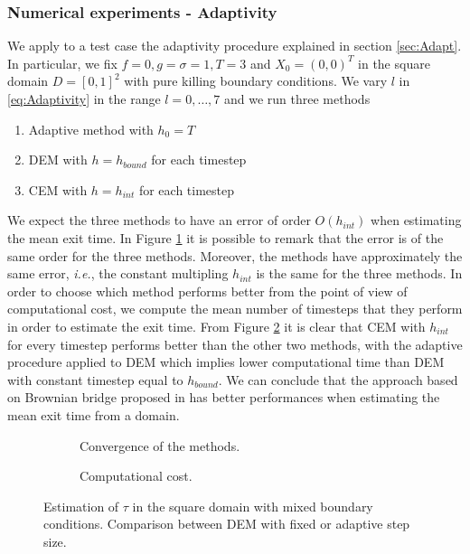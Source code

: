 \subsubsection{Numerical experiments - Adaptivity}
We apply to a test case the adaptivity procedure explained in section \ref{sec:Adapt}. In particular, we fix $f = 0, g = \sigma = 1, T = 3$ and $X_0 = (0,0)^T$ in the square domain $D = \left[0,1\right]^2$ with pure killing boundary conditions. We vary $l$ in \eqref{eq:Adaptivity} in the range $l = 0, \dots, 7$ and we run three methods
\begin{enumerate}
	\item Adaptive method with $h_0 = T$
	\item DEM with $h = h_{bound}$ for each timestep
	\item CEM with $h = h_{int}$ for each timestep
\end{enumerate}
We expect the three methods to have an error of order $O(h_{int})$ when estimating the mean exit time. In Figure \ref{fig:AdaptErr} it is possible to remark that the error is of the same order for the three methods. Moreover, the methods have approximately the same error, \textit{i.e.}, the constant multipling $h_{int}$ is the same for the three methods. In order to choose which method performs better from the point of view of computational cost, we compute the mean number of timesteps that they perform in order to estimate the exit time. From Figure \ref{fig:AdaptCost} it is clear that CEM with $h_{int}$ for every timestep performs better than the other two methods, with the adaptive procedure applied to DEM which implies lower computational time than DEM with constant timestep equal to $h_{bound}$. We can conclude that the approach based on Brownian bridge proposed in \cite{Gobet2001} has better performances when estimating the mean exit time from a domain.

\begin{figure}[t]
    \centering
    \begin{subfigure}{0.49\linewidth}
        \centering
        \resizebox{1\linewidth}{!}{ }  
        \caption{Convergence of the methods.}
        \label{fig:AdaptErr}
    \end{subfigure}
    \begin{subfigure}{0.49\linewidth}
        \centering
        \resizebox{1\linewidth}{!}{ }  
        \caption{Computational cost.}
        \label{fig:AdaptCost}
    \end{subfigure}    
    \caption{Estimation of $\tau$ in the square domain with mixed boundary conditions. Comparison between DEM with fixed or adaptive step size.}
    \label{fig:AdaptResults}
\end{figure}

